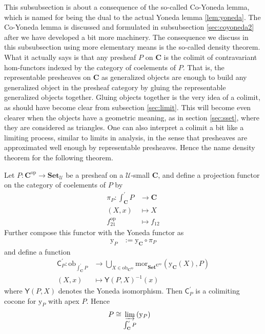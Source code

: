 This subsubsection is about a consequence of the so-called Co-Yoneda lemma, which is named for being the dual to the actual Yoneda lemma \ref{lem:yoneda}.
The Co-Yoneda lemma is discussed and formulated in subsubsection \ref{sec:coyoneda2} after we have developed a bit more machinery.
The consequence we discuss in this subsubsection using more elementary means is the so-called density theorem.
What it actually says is that any presheaf $P$ on $\mathbf{C}$ is the colimit of contravariant hom-functors indexed by the category of coelements of $P$.
That is, the representable presheaves on $\mathbf{C}$ as generalized objects are enough to build any generalized object in the presheaf category by gluing the representable generalized objects together.
Gluing objects together is the very idea of a colimit, as should have become clear from subsection \ref{sec:limit}.
This will become even clearer when the objects have a geometric meaning, as in section \ref{sec:sset}, where they are considered as triangles.
One can also interpret a colimit a bit like a limiting process, similar to limits in analysis, in the sense that presheaves are {\glqq}approximated{\grqq} well enough by representable presheaves.
Hence the name density theorem for the following theorem.
\\
\begin{thm}[Density]
\label{thm:density}
Let $P \colon \mathbf{C}^{\mathrm{op}} \rightarrow \mathbf{Set}_{\mathcal{U}}$ be a presheaf on a $\mathcal{U}$-small $\mathbf{C}$, and define a projection functor on the category of coelements of $P$ by
\begin{align*}
  \pi_{P}
  \colon
  \int_{\mathbf{C}}^{\prime}
  P
  &\rightarrow
  \mathbf{C}
  \\
  (X,x)
  &\mapsto
  X
  \\
  f_{21}^{\mathrm{op}}
  &\mapsto
  f_{12}
\end{align*}
Further compose this functor with the Yoneda functor as
\begin{align*}
  \mathrm{y}_{P}
  &:=
  \mathrm{y}_{\mathbf{C}}
  \circ
  \pi_{P}
\end{align*}
and define a function
\begin{align*}
  \mathsf{C}_{P}^{\prime}
  \colon
  \mathrm{ob}_{\int_{\mathbf{C}}^{\prime}P}
  &\rightarrow
  \bigcup_{X \in \mathrm{ob}_{\mathbf{C}^{\mathrm{op}}}}
  \mathrm{mor}_{\mathbf{Set}^{\mathbf{C}^{\mathrm{op}}}}
  \left(
    \mathrm{y}_{\mathbf{C}}(X),
    P
  \right)
  \\
  (X,x)
  &\mapsto
  \mathsf{Y}(P,X)^{-1}(x)
\end{align*}
where $\mathsf{Y}(P,X)$ denotes the Yoneda isomorphism.
Then $\mathsf{C}_{P}^{\prime}$ is a colimiting cocone for $\mathrm{y}_{P}$ with apex $P$.
Hence
\begin{align*}
  P
  &\cong
  \varinjlim_{\int_{\mathbf{C}}^{\prime}P}(\mathrm{y}_{P})
\end{align*}
\end{thm}
